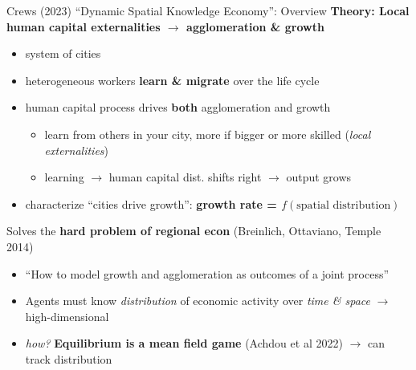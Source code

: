 \documentclass[11pt,notes=hide,aspectratio=169]{beamer}
\begin{document}
\begin{frame}{Crews (2023) ``Dynamic Spatial Knowledge Economy'': Overview}
		\textbf{Theory: Local human capital externalities $\to$ agglomeration \& growth}
        \begin{itemize}
            \item system of cities
            \item heterogeneous workers \textbf{learn \& migrate} over the life cycle
            \item human capital process drives \textbf{both} agglomeration and growth
            \begin{itemize}
                \item learn from others in your city, more if bigger or more skilled (\textit{local externalities})
                \item learning $\to$ human capital dist. shifts right $\to$ output grows
            \end{itemize}
            \item characterize ``cities drive growth'': \textbf{growth rate = $f(\text{spatial distribution})$}
        \end{itemize}
        \pause
		Solves the \textbf{\alert{hard problem of regional econ}}
        {\scriptsize (Breinlich, Ottaviano, Temple 2014)}
        \begin{itemize}
            \item ``How to model growth and agglomeration as outcomes of a joint process''
            \item Agents must know \textit{distribution} of economic activity
            over \textit{time \& space} $\to$ high-dimensional
            \item {\textit{how?} \textbf{Equilibrium is a mean field game} {\scriptsize (Achdou et al 2022)} $\to$ can track distribution\par}
        \end{itemize}
\end{frame}
\end{document}
